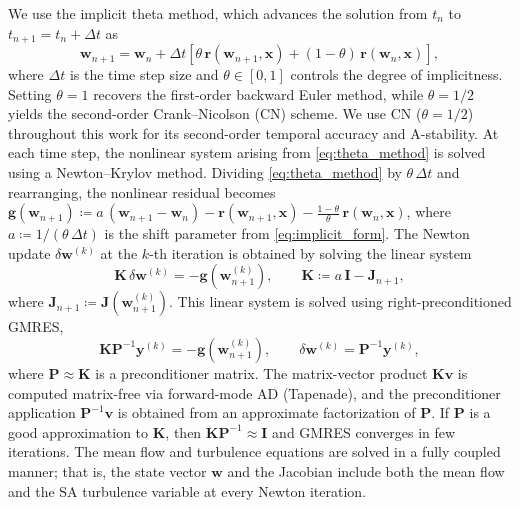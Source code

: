 \documentclass[journal]{new-aiaa}
\newcommand{\mb}[1]{\mathbf{#1}}
\begin{document}
We use the implicit theta method, which advances the solution from $t_n$ to $t_{n+1} = t_n + \Delta t$ as
\begin{equation}\label{eq:theta_method}
\mb{w}_{n+1} = \mb{w}_n + \Delta t \left[\theta \, \mb{r}(\mb{w}_{n+1}, \mb{x}) + (1-\theta) \, \mb{r}(\mb{w}_n, \mb{x})\right],
\end{equation}
where $\Delta t$ is the time step size and $\theta \in [0, 1]$ controls the degree of implicitness.
Setting $\theta = 1$ recovers the first-order backward Euler method, while $\theta = 1/2$ yields the second-order Crank--Nicolson (CN) scheme.
We use CN ($\theta = 1/2$) throughout this work for its second-order temporal accuracy and A-stability.
At each time step, the nonlinear system arising from \cref{eq:theta_method} is solved using a Newton--Krylov method.
Dividing \cref{eq:theta_method} by $\theta \, \Delta t$ and rearranging, the nonlinear residual becomes $\mb{g}(\mb{w}_{n+1}) \coloneqq a \, (\mb{w}_{n+1} - \mb{w}_n) - \mb{r}(\mb{w}_{n+1}, \mb{x}) - \tfrac{1-\theta}{\theta} \, \mb{r}(\mb{w}_n, \mb{x})$, where $a \coloneqq 1/(\theta \, \Delta t)$ is the shift parameter from \cref{eq:implicit_form}.
The Newton update $\delta \mb{w}^{(k)}$ at the $k$-th iteration is obtained by solving the linear system
\begin{equation}\label{eq:newton_system}
\mb{K} \, \delta \mb{w}^{(k)} = -\mb{g}(\mb{w}_{n+1}^{(k)}), \qquad \mb{K} \coloneqq a \, \mb{I} - \mb{J}_{n+1},
\end{equation}
where $\mb{J}_{n+1} \coloneqq \mb{J}(\mb{w}_{n+1}^{(k)})$.
This linear system is solved using right-preconditioned GMRES,
\begin{equation}\label{eq:precond_system}
\mb{K} \mb{P}^{-1} \mb{y}^{(k)} = -\mb{g}(\mb{w}_{n+1}^{(k)}), \qquad \delta \mb{w}^{(k)} = \mb{P}^{-1} \mb{y}^{(k)},
\end{equation}
where $\mb{P} \approx \mb{K}$ is a preconditioner matrix.
The matrix-vector product $\mb{K} \mb{v}$ is computed matrix-free via forward-mode AD (Tapenade), and the preconditioner application $\mb{P}^{-1} \mb{v}$ is obtained from an approximate factorization of $\mb{P}$.
If $\mb{P}$ is a good approximation to $\mb{K}$, then $\mb{K} \mb{P}^{-1} \approx \mb{I}$ and GMRES converges in few iterations.
The mean flow and turbulence equations are solved in a fully coupled manner; that is, the state vector $\mb{w}$ and the Jacobian include both the mean flow and the SA turbulence variable at every Newton iteration.
\end{document}
